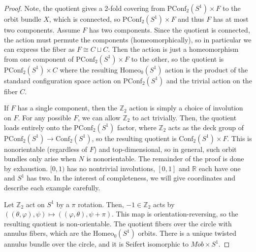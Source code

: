 \documentclass[10pt, oneside]{article}
\newcommand{\Z}{\mathbb{Z}}
\newcommand{\homeo}[1][S^1]{\text{Homeo}_0(#1)}
\newcommand{\conf}[2][S^1]{\text{Conf}_{#2}(#1)}
\newcommand{\pconf}[2][S^1]{\text{PConf}_{#2}(#1)}
\theoremstyle{definition}
\theoremstyle{definition}
\begin{document}
\begin{proof}
    Note, 
    the quotient gives a 2-fold covering 
    from $\pconf{2}\times F$ 
    to the orbit bundle $X$, 
    which is connected, 
    so $\pconf{2}\times F$ 
    and thus $F$ has at most two components. 
    Assume $F$ has two components. 
    Since the quotient is connected, 
    the action must permute the components (homeomorphically), 
    so in particular we can express the fiber 
    as $F\cong C\sqcup C$. 
    Then the action is just a homeomorphism 
    from one component of $\pconf{2}\times F$ to the other, 
    so the quotient is $\pconf{2}\times C$ 
    where the resulting $\homeo$ action is the product of the standard configuration space action on $\pconf{2}$ and the trivial action on the fiber $C$.

    If $F$ has a single component, 
    then the $\Z_2$ action is simply a choice of involution on $F$. For any possible $F$, 
    we can allow $\Z_2$ to act trivially. 
    Then, 
    the quotient loads entirely 
    onto the $\pconf{2}$ factor, 
    where $\Z_2$ acts as the deck group of $\pconf{2}\to\conf{2}$, 
    so the resulting quotient is $\conf{2}\times F$. 
    This is nonorientable (regardless of $F$) and top-dimensional, 
    so in general, 
    such orbit bundles only arise when $N$ is nonorientable. 
    The remainder of the proof is done by exhaustion. 
    $[0,1)$ has no nontrivial involutions, 
    $[0,1]$ and $\mathbb{R}$ each have one 
    and $S^1$ has two. In the interest of completeness, we will give coordinates and describe each example carefully.

    Let $\Z_2$ act on $S^1$ by a $\pi$ rotation. Then, $-1\in\Z_2$ acts by $((\theta, \varphi), \psi) \mapsto ((\varphi, \theta), \psi + \pi)$. This map is orientation-reversing, so the resulting quotient is non-orientable. The quotient fibers over the circle with annulus fibers, which are the $\homeo$ orbits. There is a unique twisted annulus bundle over the circle, and it is Seifert isomorphic to $M\ddot{o}b \times S^1$.


\end{proof}
\end{document}
